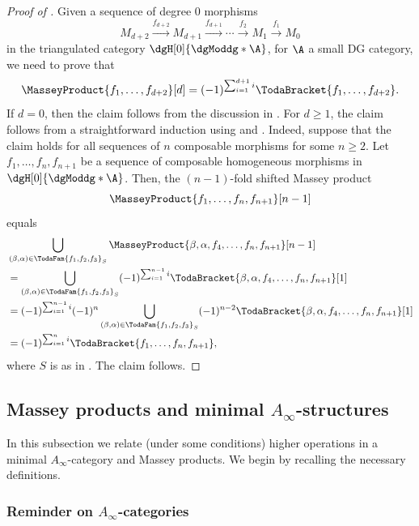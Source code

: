 \documentclass[a4paper]{amsart}
\begin{document}
\begin{proof}[Proof of ]
  Given a sequence of degree $0$ morphisms
  \[
    M_{d+2}\xrightarrow{f_{d+2}}M_{d+1}\xrightarrow{f_{d+1}}\cdots\xrightarrow{f_2}M_1\xrightarrow{f_1}M_0
  \]
  in the triangulated category $\dgH[0]{\dgModdg*{\A}}$, for $\A$ a small DG
  category, we need to prove that
  \[
    \MasseyProduct{f_1,\dots,f_{d+2}}[d]=(-1)^{\sum_{i=1}^{d+1}
      i}\TodaBracket{f_1,\dots,f_{d+2}}.
  \]
  If $d=0$, then the claim follows from the discussion in
  . For $d\geq1$, the claim follows from a
  straightforward induction using
   and
  . Indeed, suppose that the claim holds for all
  sequences of $n$ composable morphisms for some $n\geq2$. Let
  $f_1,\dots,f_n,f_{n+1}$ be a sequence of composable homogeneous morphisms in
  $\dgH[0]{\dgModdg*{\A}}$. Then, the $(n-1)$-fold shifted Massey product
  \[
    \MasseyProduct{f_1,\dots,f_n,f_{n+1}}[n-1]
  \]
  equals
  \begin{align*}
    & \bigcup_{(\beta,\alpha)\in\TodaFam{f_1,f_2,f_3}_S}\MasseyProduct{\beta,\alpha,f_4,\dots,f_n,f_{n+1}}[n-1]                                         \\
    & =\bigcup_{(\beta,\alpha)\in\TodaFam{f_1,f_2,f_3}_S}(-1)^{\sum_{i=1}^{n-1} i}\TodaBracket{\beta,\alpha,f_4,\dots,f_n,f_{n+1}}[1]                   \\
    & =(-1)^{\sum_{i=1}^{n-1} i}(-1)^{n}\bigcup_{(\beta,\alpha)\in\TodaFam{f_1,f_2,f_3}_S}(-1)^{n-2}\TodaBracket{\beta,\alpha,f_4,\dots,f_n,f_{n+1}}[1] \\
    & =(-1)^{\sum_{i=1}^{n} i}\TodaBracket{f_1,\dots,f_n,f_{n+1}},
  \end{align*}
  where $S$ is as in . The claim follows.
\end{proof}

\subsection{Massey products and minimal $A_\infty$-structures}

In this subsection we relate (under some conditions) higher operations in a
minimal $A_\infty$-category and Massey products. We begin by recalling the
necessary definitions.

\subsubsection{Reminder on $A_\infty$-categories}
\end{document}

